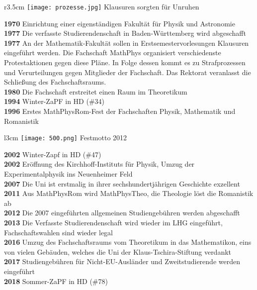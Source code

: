\begin{wrapfigure}{r}{3.5cm}
\vspace{-13pt}
\texttt{[image: prozesse.jpg]}
\small{Klausuren sorgten für Unruhen}
\vspace{5pt}
\end{wrapfigure}

\textbf{1970} Einrichtung einer eigenständigen Fakultät für Physik und Astronomie\\
\textbf{1977} Die verfasste Studierendenschaft in Baden-Württemberg wird abgeschafft\\
\textbf{1977} An der Mathematik-Fakultät sollen in Erstsemestervorlesungen Klausuren eingeführt werden.
Die Fachschaft MathPhys organisiert verschiedenste Protestaktionen gegen diese Pläne. In Folge dessen kommt es zu Strafprozessen und Verurteilungen gegen Mitglieder der Fachschaft. Das Rektorat veranlasst die Schließung des Fachschaftsraums.\\
\textbf{1980} Die Fachschaft erstreitet einen Raum im Theoretikum\\
\textbf{1994} Winter-ZaPF in HD (\#34)\\
\textbf{1996} Erstes MathPhysRom-Fest der Fachschaften Physik, Mathematik und Romanistik

\begin{wrapfigure}{l}{3cm}
\texttt{[image: 500.png]}
\small{Festmotto 2012}
\end{wrapfigure}
\textbf{2002} Winter-Zapf in HD (\#47)\\
\textbf{2002} Eröffnung des Kirchhoff-Instituts für Physik, Umzug der Experimentalphysik ins Neuenheimer Feld\\
\textbf{2007} Die Uni ist erstmalig in ihrer sechshundertjährigen Geschichte exzellent\\
\textbf{2011} Aus MathPhysRom wird MathPhysTheo, die Theologie löst die Romanistik ab\\
\textbf{2012} Die 2007 eingeführten allgemeinen Studiengebühren werden abgeschafft\\
\textbf{2013} Die Verfasste Studierendenschaft wird wieder im LHG eingeführt, Fachschaftswahlen sind wieder legal\\
\textbf{2016} Umzug des Fachschaftsraums vom Theoretikum in das Mathematikon, eins von vielen Gebäuden, welches die Uni der Klaus-Tschira-Stiftung verdankt\\
\textbf{2017} Studiengebühren für Nicht-EU-Ausländer und Zweitstudierende werden eingeführt\\
\textbf{2018} Sommer-ZaPF in HD (\#78)
